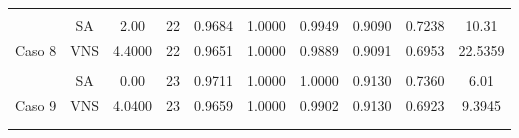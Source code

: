 \begin{table}
{\begin{tabular}{cccccccccc}
			&     &                                                                      &                                                                    &                                                         &        &        &        &        &              \\
			\multicolumn{1}{c|}{}                         & SA  & 2.00                                                                 & 22                                                                 & 0.9684                                                  & 1.0000 & 0.9949 & 0.9090 & 0.7238 & 10.31        \\
			\multicolumn{1}{c|}{\multirow{-2}{*}{Caso 8}} & VNS & 4.4000                                                               & 22                                                                 & 0.9651                                                  & 1.0000 & 0.9889 & 0.9091 & 0.6953 & 22.5359      \\
			&     &                                                                      &                                                                    &                                                         &        &        &        &        &              \\
			\multicolumn{1}{c|}{}                         & SA  & 0.00                                                                 & 23                                                                 & 0.9711                                                  & 1.0000 & 1.0000 & 0.9130 & 0.7360 & 6.01         \\
			\multicolumn{1}{c|}{\multirow{-2}{*}{Caso 9}} & VNS & 4.0400                                                               & 23                                                                 & 0.9659                                                  & 1.0000 & 0.9902 & 0.9130 & 0.6923 & 9.3945       \\
			&     &                                                                      &                                                                    &                                                         &        &        &        &        &              \\
			\multicolumn{10}{c}{}                                                                                                                                                                                                                                                                                        \\ \hline
		\end{tabular}%
	}
\end{table}


